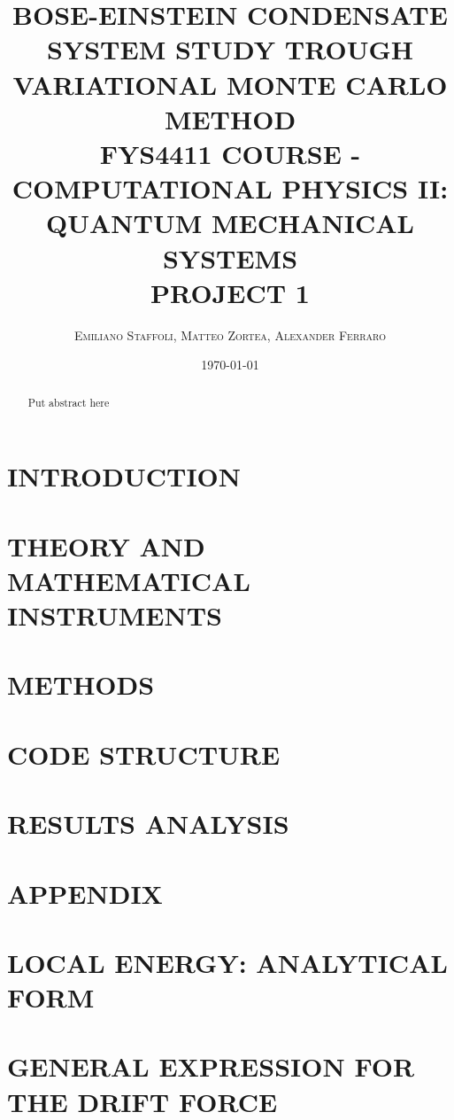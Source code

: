 \documentclass[a4paper]{article}
\title{\LARGE BOSE-EINSTEIN CONDENSATE SYSTEM STUDY TROUGH VARIATIONAL MONTE CARLO METHOD \\ \vspace{5mm}  \large FYS4411 COURSE - COMPUTATIONAL PHYSICS II: QUANTUM MECHANICAL SYSTEMS \\ \large PROJECT 1 }
\author{\textsc{Emiliano Staffoli, Matteo Zortea, Alexander Ferraro }}
\date{\today}
\begin{document}
\setcounter{page}{1}

\maketitle

\begin{abstract}
    Put abstract here
\end{abstract}

\begin{multicols*}{2}
 \noindent

\section{INTRODUCTION}
   
   
\section{THEORY AND MATHEMATICAL INSTRUMENTS}
    
   
\section{METHODS}
    
    
\section{CODE STRUCTURE}




\newpage 

\section{RESULTS ANALYSIS}


\newpage
\section*{APPENDIX}
\appendix
\section{LOCAL ENERGY: ANALYTICAL FORM}
\label{appendix:local_energy}


\section{GENERAL EXPRESSION FOR THE DRIFT FORCE}
\label{appendix:drift_force_general}

\end{multicols*}

\newpage
\begin{multicols}{2}
\printbibliography
\end{multicols}
\end{document}
